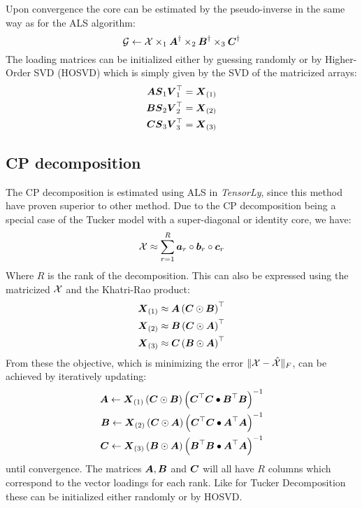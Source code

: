 Upon convergence the core can be estimated by the pseudo-inverse in the same way as for the ALS algorithm:
\begin{equation}
    \mathcal{G} \leftarrow \mathcal{X} \times_1 \boldsymbol{A}^{\dagger} \times_2 \boldsymbol{B}^{\dagger} \times_3 \boldsymbol{C}^{\dagger}
\end{equation}
The loading matrices can be initialized either by guessing randomly or by Higher-Order SVD (HOSVD) which is simply given by the SVD of the matricized arrays:
\begin{align}
    \boldsymbol{A} \boldsymbol{S}_1\boldsymbol{V}_1^{\top} &= \boldsymbol{X}_{(1)} \\
    \boldsymbol{B} \boldsymbol{S}_2\boldsymbol{V}_2^{\top} &= \boldsymbol{X}_{(2)} \\
    \boldsymbol{C} \boldsymbol{S}_3\boldsymbol{V}_3^{\top} &= \boldsymbol{X}_{(3)}
\end{align}

\subsection{CP decomposition}
The CP decomposition is estimated using ALS in \textit{TensorLy}, since this method have proven superior to other method\cite[29]{Mørup2011}. Due to the CP decomposition being a special case of the Tucker model with a super-diagonal or identity core, we have:
\begin{equation}
    \mathcal{X} \approx \sum_{r=1}^R \boldsymbol{a}_r \circ \boldsymbol{b}_r \circ \boldsymbol{c}_r
\end{equation}
Where $R$ is the rank of the decomposition. This can also be expressed using the matricized $\mathcal{X}$ and the Khatri-Rao product:
\begin{align}
    \boldsymbol{X}_{(1)} &\approx \boldsymbol{A}\left( \boldsymbol{C} \odot \boldsymbol{B}\right)^\top \\
    \boldsymbol{X}_{(2)} &\approx \boldsymbol{B}\left( \boldsymbol{C} \odot \boldsymbol{A}\right)^\top \\
    \boldsymbol{X}_{(3)} &\approx \boldsymbol{C}\left( \boldsymbol{B} \odot \boldsymbol{A}\right)^\top
\end{align}
From these the objective, which is minimizing the error $\| \mathcal{X} - \hat{\mathcal{X}}\|_F$, can be achieved by iteratively updating:
\begin{align}
    \boldsymbol{A} \leftarrow \boldsymbol{X}_{(1)}\left( \boldsymbol{C} \odot \boldsymbol{B} \right)\left(
    \boldsymbol{C}^\top \boldsymbol{C} \bullet \boldsymbol{B}^\top \boldsymbol{B}\right)^{-1} \\
    \boldsymbol{B} \leftarrow \boldsymbol{X}_{(2)}\left( \boldsymbol{C} \odot \boldsymbol{A} \right)\left(
    \boldsymbol{C}^\top \boldsymbol{C} \bullet \boldsymbol{A}^\top \boldsymbol{A}\right)^{-1} \\
    \boldsymbol{C} \leftarrow \boldsymbol{X}_{(3)}\left( \boldsymbol{B} \odot \boldsymbol{A} \right)\left(
    \boldsymbol{B}^\top \boldsymbol{B} \bullet \boldsymbol{A}^\top \boldsymbol{A}\right)^{-1}
\end{align}
until convergence\cite[28]{Kolda2007}. The matrices $\boldsymbol{A}, \boldsymbol{B}$ and $\boldsymbol{C}$ will all have $R$ columns which correspond to the vector loadings for each rank. Like for Tucker Decomposition these can be initialized either randomly or by HOSVD.

